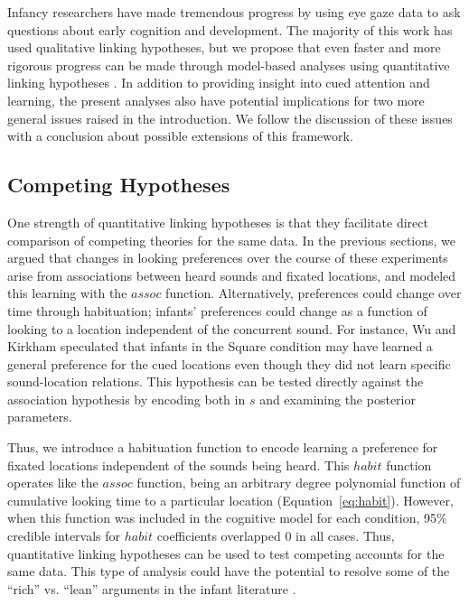 \documentclass[12pt]{article}
\begin{document}
	Infancy researchers have made tremendous progress by using eye gaze data to ask questions about early cognition and development. The majority of this work has used qualitative linking hypotheses, but we propose that even faster and more rigorous progress can be made through model-based analyses using quantitative linking hypotheses \cite{Aslin2007, Teller1984}. In addition to providing insight into cued attention and learning, the present analyses also have potential implications for two more general issues raised in the introduction. We follow the discussion of these issues with a conclusion about possible extensions of this framework.

\subsection*{Competing Hypotheses}

	One strength of quantitative linking hypotheses is that they facilitate direct comparison of competing theories for the same data. In the previous sections, we argued that changes in looking preferences over the course of these experiments arise from associations between heard sounds and fixated locations, and modeled this learning with the $assoc$ function. Alternatively, preferences could change over time through habituation; infants' preferences could change as a function of looking to a location independent of the concurrent sound. For instance, Wu and Kirkham \cite{Wu2010a} speculated that infants in the Square condition may have learned a general preference for the cued locations even though they did not learn specific sound-location relations. This hypothesis can be tested directly against the association hypothesis by encoding both in $s$ and examining the posterior parameters.

	Thus, we introduce a habituation function to encode learning a preference for fixated locations independent of the sounds being heard. This $habit$ function operates like the $assoc$ function, being an arbitrary degree polynomial function of cumulative looking time to a particular location (Equation~\ref{eq:habit}). However, when this function was included in the cognitive model for each condition, 95\% credible intervals for $habit$ coefficients overlapped 0 in all cases. Thus, quantitative linking hypotheses can be used to test competing accounts for the same data. This type of analysis could have the potential to resolve some of the ``rich'' vs. ``lean'' arguments in the infant literature \cite{Spelke1998, Aslin2000, Munakata2000}.
\end{document}
